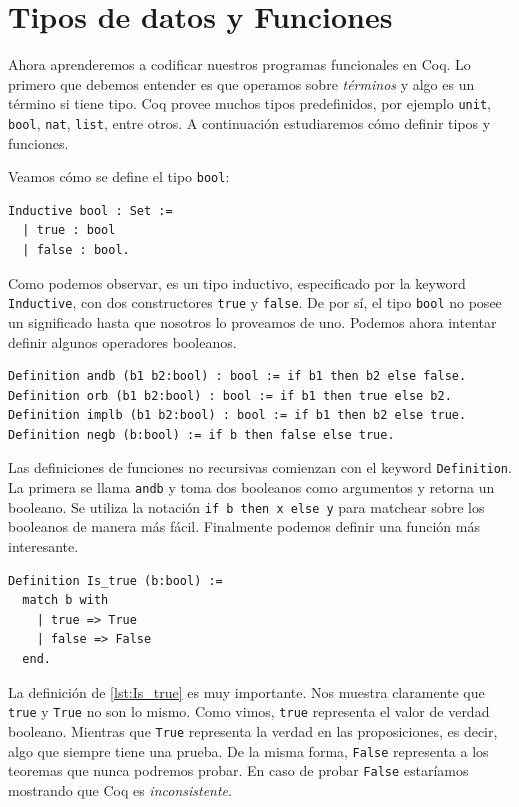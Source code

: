 
\section{Tipos de datos y Funciones}

Ahora aprenderemos a codificar nuestros programas funcionales en Coq. Lo primero que debemos entender es que operamos sobre \textit{términos} y algo es un término si tiene tipo. Coq provee muchos tipos predefinidos, por ejemplo \lstinline{unit}, \lstinline{bool}, \lstinline{nat}, \lstinline{list}, entre otros. A continuación estudiaremos cómo definir tipos y funciones.

Veamos cómo se define el tipo \lstinline{bool}:

\begin{lstlisting}
Inductive bool : Set :=
  | true : bool
  | false : bool.
\end{lstlisting}

Como podemos observar, es un tipo inductivo, especificado por la keyword \lstinline{Inductive}, con dos constructores \lstinline{true} y \lstinline{false}. De por sí, el tipo \lstinline{bool} no posee un significado hasta que nosotros lo proveamos de uno. Podemos ahora intentar definir algunos operadores booleanos.
\begin{lstlisting}
Definition andb (b1 b2:bool) : bool := if b1 then b2 else false.
Definition orb (b1 b2:bool) : bool := if b1 then true else b2.
Definition implb (b1 b2:bool) : bool := if b1 then b2 else true.
Definition negb (b:bool) := if b then false else true.
\end{lstlisting}

Las definiciones de funciones no recursivas comienzan con el keyword \lstinline{Definition}. La primera se llama \lstinline{andb} y toma dos booleanos como argumentos y retorna un booleano. Se utiliza la notación \lstinline{if b then x else y} para matchear sobre los booleanos de manera más fácil. Finalmente podemos definir una función más interesante.

\begin{lstlisting}[frame=tb,caption={Definición de \lstinline{Is_true}},label=lst:Is_true]
Definition Is_true (b:bool) :=
  match b with
    | true => True
    | false => False
  end.
\end{lstlisting}

La definición de \ref{lst:Is_true} es muy importante. Nos muestra claramente que \lstinline{true} y \lstinline{True} no son lo mismo. Como vimos, \lstinline{true} representa el valor de verdad booleano. Mientras que \lstinline{True} representa la verdad en las proposiciones, es decir, algo que siempre tiene una prueba. De la misma forma, \lstinline{False} representa a los teoremas que nunca podremos probar. En caso de probar \lstinline{False} estaríamos mostrando que Coq es \emph{inconsistente}.

